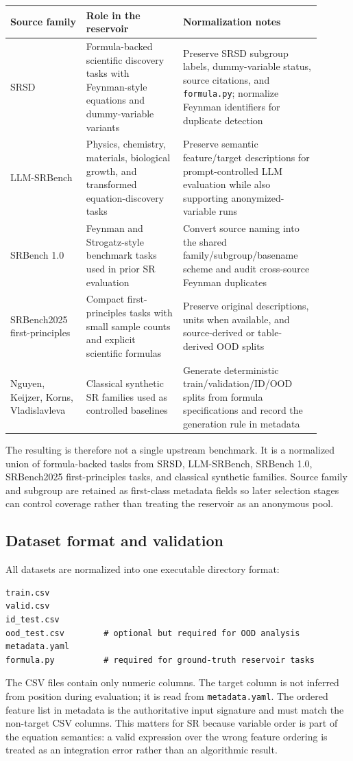 \begin{center}
\small
\begin{tabular}{p{0.22\linewidth}p{0.28\linewidth}p{0.40\linewidth}}
\toprule
\textbf{Source family} & \textbf{Role in the reservoir} & \textbf{Normalization notes} \\
\midrule
SRSD & Formula-backed scientific discovery tasks with Feynman-style equations and dummy-variable variants & Preserve SRSD subgroup labels, dummy-variable status, source citations, and \texttt{formula.py}; normalize Feynman identifiers for duplicate detection \\
LLM-SRBench & Physics, chemistry, materials, biological growth, and transformed equation-discovery tasks & Preserve semantic feature/target descriptions for prompt-controlled LLM evaluation while also supporting anonymized-variable runs \\
SRBench 1.0 & Feynman and Strogatz-style benchmark tasks used in prior SR evaluation & Convert source naming into the shared family/subgroup/basename scheme and audit cross-source Feynman duplicates \\
SRBench2025 first-principles & Compact first-principles tasks with small sample counts and explicit scientific formulas & Preserve original descriptions, units when available, and source-derived or table-derived OOD splits \\
Nguyen, Keijzer, Korns, Vladislavleva & Classical synthetic SR families used as controlled baselines & Generate deterministic train/validation/ID/OOD splits from formula specifications and record the generation rule in metadata \\
\bottomrule
\end{tabular}
\end{center}

The resulting \reservoir{} is therefore not a single upstream benchmark. It is a normalized union of formula-backed tasks from SRSD, LLM-SRBench, SRBench 1.0, SRBench2025 first-principles tasks, and classical synthetic families. Source family and subgroup are retained as first-class metadata fields so later selection stages can control coverage rather than treating the reservoir as an anonymous pool.

\subsection{Dataset format and validation}

All datasets are normalized into one executable directory format:
\begin{verbatim}
train.csv
valid.csv
id_test.csv
ood_test.csv        # optional but required for OOD analysis
metadata.yaml
formula.py          # required for ground-truth reservoir tasks
\end{verbatim}
The CSV files contain only numeric columns. The target column is not inferred from position during evaluation; it is read from \texttt{metadata.yaml}. The ordered feature list in metadata is the authoritative input signature and must match the non-target CSV columns. This matters for SR because variable order is part of the equation semantics: a valid expression over the wrong feature ordering is treated as an integration error rather than an algorithmic result.


